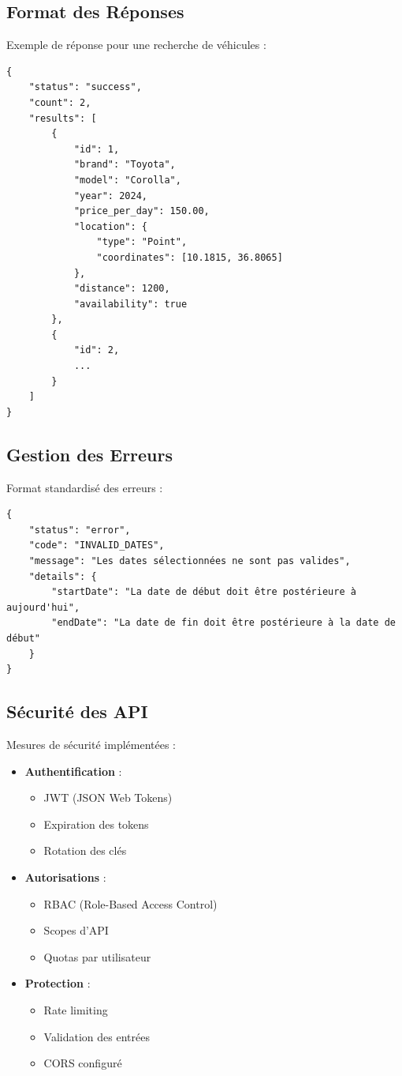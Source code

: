 \subsection{Format des Réponses}
Exemple de réponse pour une recherche de véhicules :

\begin{verbatim}
{
    "status": "success",
    "count": 2,
    "results": [
        {
            "id": 1,
            "brand": "Toyota",
            "model": "Corolla",
            "year": 2024,
            "price_per_day": 150.00,
            "location": {
                "type": "Point",
                "coordinates": [10.1815, 36.8065]
            },
            "distance": 1200,
            "availability": true
        },
        {
            "id": 2,
            ...
        }
    ]
}
\end{verbatim}

\subsection{Gestion des Erreurs}
Format standardisé des erreurs :

\begin{verbatim}
{
    "status": "error",
    "code": "INVALID_DATES",
    "message": "Les dates sélectionnées ne sont pas valides",
    "details": {
        "startDate": "La date de début doit être postérieure à aujourd'hui",
        "endDate": "La date de fin doit être postérieure à la date de début"
    }
}
\end{verbatim}

\subsection{Sécurité des API}
Mesures de sécurité implémentées :

\begin{itemize}
    \item \textbf{Authentification} :
    \begin{itemize}
        \item JWT (JSON Web Tokens)
        \item Expiration des tokens
        \item Rotation des clés
    \end{itemize}
    
    \item \textbf{Autorisations} :
    \begin{itemize}
        \item RBAC (Role-Based Access Control)
        \item Scopes d'API
        \item Quotas par utilisateur
    \end{itemize}
    
    \item \textbf{Protection} :
    \begin{itemize}
        \item Rate limiting
        \item Validation des entrées
        \item CORS configuré
    \end{itemize}
\end{itemize}


